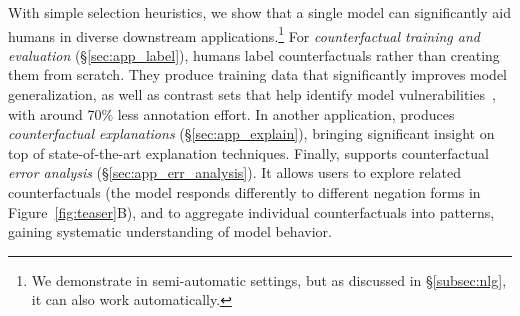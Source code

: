 
With simple selection heuristics, we show that a single \sysname model can significantly aid humans in diverse downstream applications.\footnote{We demonstrate \sysname in semi-automatic settings, but as discussed in \S\ref{subsec:nlg}, it can also work automatically.} 
For \emph{counterfactual training and evaluation} (\S\ref{sec:app_label}), humans label \sysname counterfactuals rather than creating them from scratch.
They produce training data that significantly improves model generalization, as well as contrast sets that help identify model vulnerabilities~\cite{gardner2020contrast}, with around 70\% less annotation effort. 
In another application, \sysname produces \emph{counterfactual explanations} (\S\ref{sec:app_explain}), bringing significant insight on top of state-of-the-art explanation techniques. 
Finally, \sysname supports counterfactual \emph{error analysis} (\S\ref{sec:app_err_analysis}).
It allows users to explore related counterfactuals (\eg the model responds differently to different negation forms in Figure~\ref{fig:teaser}B), and to aggregate individual counterfactuals into patterns, gaining systematic understanding of model behavior. 



